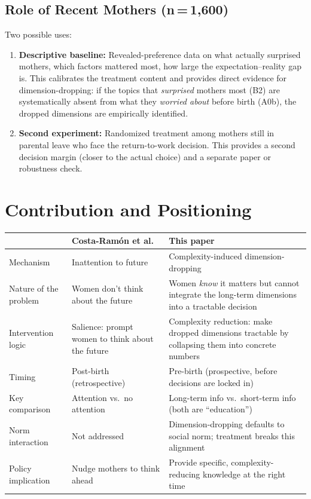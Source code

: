 \documentclass[12pt,a4paper]{article}
\begin{document}
\subsection{Role of Recent Mothers (n\,=\,1{,}600)}

Two possible uses:
\begin{enumerate}[nosep]
    \item \textbf{Descriptive baseline:} Revealed-preference data on what actually surprised mothers, which factors mattered most, how large the expectation--reality gap is. This calibrates the treatment content and provides direct evidence for dimension-dropping: if the topics that \emph{surprised} mothers most (B2) are systematically absent from what they \emph{worried about} before birth (A0b), the dropped dimensions are empirically identified.
    \item \textbf{Second experiment:} Randomized treatment among mothers still in parental leave who face the return-to-work decision. This provides a second decision margin (closer to the actual choice) and a separate paper or robustness check.
\end{enumerate}

\section{Contribution and Positioning}

\begin{table}[h]
\centering
\small
\begin{tabular}{@{}p{3.8cm}p{4.2cm}p{5.5cm}@{}}
\toprule
& \textbf{Costa-Ram\'on et al.} & \textbf{This paper} \\
\midrule
Mechanism & Inattention to future & Complexity-induced dimension-dropping \\[0.3em]
Nature of the problem & Women don't think about the future & Women \emph{know} it matters but cannot integrate the long-term dimensions into a tractable decision \\[0.3em]
Intervention logic & Salience: prompt women to think about the future & Complexity reduction: make dropped dimensions tractable by collapsing them into concrete numbers \\[0.3em]
Timing & Post-birth (retrospective) & Pre-birth (prospective, before decisions are locked in) \\[0.3em]
Key comparison & Attention vs.\ no attention & Long-term info vs.\ short-term info (both are ``education'') \\[0.3em]
Norm interaction & Not addressed & Dimension-dropping defaults to social norm; treatment breaks this alignment \\[0.3em]
Policy implication & Nudge mothers to think ahead & Provide specific, complexity-reducing knowledge at the right time \\
\bottomrule
\end{tabular}
\end{table}
\end{document}
